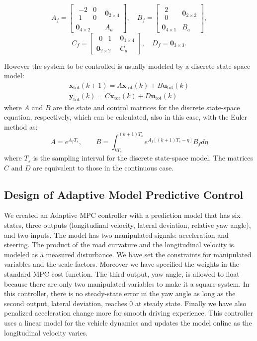 \documentclass[conference, 11pt]{IEEEtran}
\begin{document}
\[ 
A_f=\begin{bmatrix}
\begin{matrix}-2&0\\1&0\end{matrix}&\textbf{0}_{2\times4}\\
\textbf{0}_{4\times2}&A_a
\end{bmatrix},
\quad
B_f=\begin{bmatrix}\begin{matrix}2\\0\end{matrix}&\textbf{0}_{2\times2}\\
\textbf{0}_{4\times1}&B_a
\end{bmatrix},
\]
\[
C_f=\begin{bmatrix}
\begin{matrix}0&1\end{matrix}&\textbf{0}_{1\times4}\\
\textbf{0}_{2\times2}&C_a
\end{bmatrix}, 
\quad
D_f=\textbf{0}_{3\times3}. 
\]

However the system to be controlled is usually modeled by a discrete state-space model:
\begin{equation*}
\label{eqn:full_dynamics_model_disc}
\begin{array}{rr}
{\textbf{x}}_{\text{tot}}(k+1) =A \textbf{x}_{\text{tot}}(k)+ B \textbf{u}_{\text{tot}}(k)\\
\textbf{y}_{\text{tot}}(k) =C\textbf{x}_{\text{tot}}(k) + D \textbf{u}_{\text{tot}}(k)
\end{array}
\end{equation*}
where $A$ and $B$ are the state and control matrices for the discrete state-space equation, respectively, which can be calculated, also in this case, with the Euler method as:
\[
A = e^{A_fT_s},\qquad B = \int_{kT_s}^{(k+1)T_s} e^{A_f[(k+1)T_s-\eta]}B_f d\eta
\]
where $T_s$ is the sampling interval for the discrete state-space model. The matrices $C$ and $D$ are equivalent to those in the continuous case.

\subsection{Design of Adaptive Model Predictive Control}
We created an Adaptive MPC controller with a prediction model that has six states, three outputs (longitudinal velocity, lateral deviation, relative yaw angle), and two inputs. The model has two manipulated signals: acceleration and steering. The product of the road curvature and the longitudinal velocity is modeled as a measured disturbance. We have set the constraints for manipulated variables and the scale factors. Moreover we have specified the weights in the standard MPC cost function. The third output, yaw angle, is allowed to float because there are only two manipulated variables to make it a square system. In this controller, there is no steady-state error in the yaw angle as long as the second output, lateral deviation, reaches 0 at steady state. Finally we have also penalized acceleration change more for smooth driving experience. This controller uses a linear model for the vehicle dynamics and updates the model online as the longitudinal velocity varies.
\end{document}
